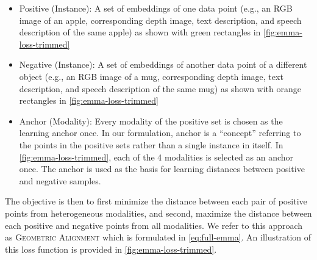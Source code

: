 \documentclass[10pt]{article} %
\newcommand{\todokd}[1]{\todo[color=red!20]{{\small #1 -- Kasra}}}
\newcommand{\geom}{\textsc{Geometric Alignment}}
\newcommand{\supcon}{\textsc{SupCon}}
\begin{document}
\begin{itemize}
    \item Positive (Instance): A set of embeddings of one data point (e.g., an RGB image of an apple, corresponding depth image, text description, and speech description of the same apple) as shown with green rectangles in \cref{fig:emma-loss-trimmed}
    \item Negative (Instance): A set of embeddings of another data point of a different object (e.g., an RGB image of a mug, corresponding depth image, text description, and speech description of the same mug) as shown with orange rectangles in \cref{fig:emma-loss-trimmed}
    \item Anchor (Modality): Every modality of the positive set is chosen as the learning anchor once. In our formulation, anchor is a ``concept'' referring to the points in the positive sets rather than a single instance in itself. In \cref{fig:emma-loss-trimmed}, each of the 4 modalities is selected as an anchor once.
    The anchor is used as the basis for learning distances between positive and negative samples.
\end{itemize}

The objective is then to first minimize the distance between each pair of positive points from heterogeneous modalities, and second, maximize the distance between each positive and negative points from all modalities.
We refer to this approach as \geom{} which is formulated in \cref{eq:full-emma}. An illustration of this loss function is provided in \cref{fig:emma-loss-trimmed}.
\end{document}
